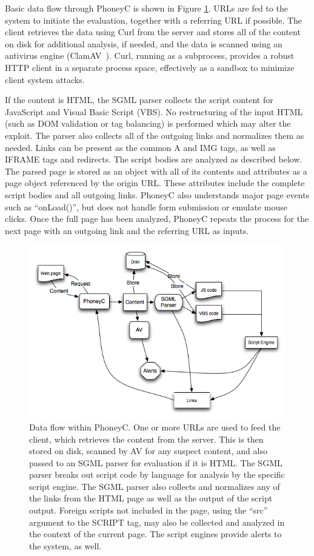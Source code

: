 \documentclass[10pt,twocolumn]{article}
\begin{document}
Basic data flow through PhoneyC is shown in Figure \ref{fig:phoneyc-flow}. URLs are fed to the system to initiate the evaluation, together with a referring URL if possible. The client retrieves the data using Curl from the server and stores all of the content on disk for additional analysis, if needed, and the data is scanned using an antivirus engine (ClamAV~\cite{kojm:ch}). Curl, running as a subprocess, provides a robust HTTP client in a separate process space, effectively as a sandbox to minimize client system attacks. 

If the content is HTML, the SGML parser collects the script content for JavaScript and Visual Basic Script (VBS). No restructuring of the input HTML (such as DOM validation or tag balancing) is performed which may alter the exploit. The parser also collects all of the outgoing links and normalizes them as needed. Links can be present as the common A and IMG tags, as well as IFRAME tags and redirects. The script bodies are analyzed as described below. The parsed page is stored as an object with all of its contents and attributes as a page object referenced by the origin URL. These attributes include the complete script bodies and all outgoing links. PhoneyC also understands major page events such as ``onLoad()'', but does not handle form submission or emulate mouse clicks. Once the full page has been analyzed, PhoneyC repeats the process for the next page with an outgoing link and the referring URL as inputs.

\begin{figure}[tb]
  \centering
  \includegraphics[width=\columnwidth]{pics/phoneyc_flow}
  \scriptsize
  \caption{Data flow within PhoneyC. One or more URLs are used to feed the client, which retrieves the content from the server. This is then stored on disk, scanned by AV for any suspect content, and also passed to an SGML parser for evaluation if it is HTML. The SGML parser breaks out script code by language for analysis by the specific script engine. The SGML parser also collects and normalizes any of the links from the HTML page as well as the output of the script output. Foreign scripts not included in the page, using the ``src'' argument to the SCRIPT tag, may also be collected and analyzed in the context of the current page. The script engines provide alerts to the system, as well.}
  \normalsize
  \label{fig:phoneyc-flow}
\end{figure}
\end{document}
